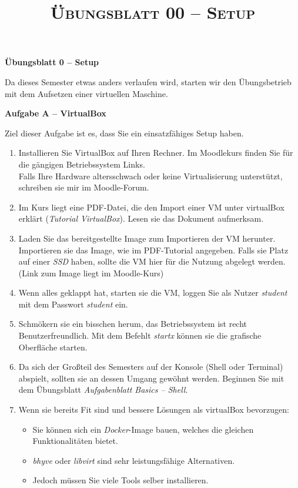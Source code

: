 \documentclass[paper=a4,fontsize=11pt]{scrartcl}%
\title{	
\normalfont \normalsize 
\textsc{Übungsblatt 00 -- Setup}
}
\numberwithin{equation}{section}
\begin{document}
\begin{center}\Large{\textbf{Übungsblatt 0 -- Setup}}\end{center}

Da dieses Semester etwas anders verlaufen wird, starten wir den Übungsbetrieb mit dem Aufsetzen einer virtuellen Maschine. 
\begin{center}\Large{\textbf{Aufgabe A -- VirtualBox}}\end{center}\vskip0.25in
Ziel dieser Aufgabe ist es, dass Sie ein einsatzfähiges Setup haben.
\begin{enumerate}
	\item Installieren Sie VirtualBox auf Ihren Rechner. Im Moodlekurs finden Sie für die gängigen Betriebssystem Links.\\
	Falls Ihre Hardware altersschwach oder keine Virtualisierung unterstützt, schreiben sie mir im Moodle-Forum.
	\item Im Kurs liegt eine PDF-Datei, die den Import einer VM unter virtualBox erklärt (\emph{Tutorial VirtualBox}). Lesen sie das Dokument aufmerksam.
	\item Laden Sie das bereitgestellte Image zum Importieren der VM herunter. Importieren sie das Image, wie im PDF-Tutorial angegeben. Falls sie Platz auf einer \emph{SSD} haben, sollte die VM hier für die Nutzung abgelegt werden.\\
	(Link zum Image liegt im Moodle-Kurs)
	\item Wenn alles geklappt hat, starten sie die VM, loggen Sie als Nutzer \emph{student} mit dem Passwort \emph{student} ein.
	\item Schmökern sie ein bisschen herum, das Betriebssystem ist recht Benutzerfreundlich. Mit dem Befehlt \emph{startx} können sie die grafische Oberfläche starten.
	\item Da sich der Großteil des Semesters auf der Konsole (Shell oder Terminal) abspielt, sollten sie an dessen Umgang gewöhnt werden. Beginnen Sie mit dem Übungsblatt \emph{Aufgabenblatt Basics -- Shell}.
	\item Wenn sie bereits Fit sind und bessere Lösungen als virtualBox bevorzugen:
	\begin{itemize}
		\item Sie können sich ein \emph{Docker}-Image bauen, welches die gleichen Funktionalitäten bietet.
		\item \emph{bhyve} oder \emph{libvirt} sind sehr leistungsfähige Alternativen.
		\item Jedoch müssen Sie viele Tools selber installieren.
	\end{itemize}
\end{enumerate}
\end{document}
